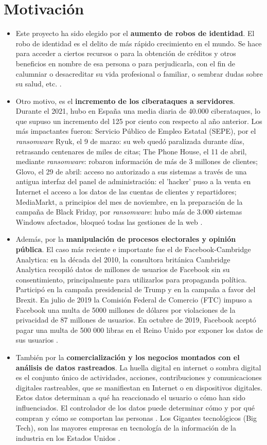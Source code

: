 \section{Motivación}
\begin{itemize}
    \item Este proyecto ha sido elegido por el \textbf{aumento de robos de identidad}. El robo de identidad es el delito de más rápido crecimiento en el mundo. Se hace para acceder a ciertos recursos o para la obtención de créditos y otros beneficios en nombre de esa persona o para perjudicarla, con el fin de calumniar o desacreditar su vida profesional o familiar, o sembrar dudas sobre su salud, etc. \cite{web:robo_de_identidad}.
    \item Otro motivo, es el \textbf{incremento de los ciberataques a servidores}. Durante el 2021, hubo en España una media diaria de 40.000 ciberataques, lo que supuso un incremento del 125 por ciento con respecto al año anterior. Los más impactantes fueron: Servicio Público de Empleo Estatal (SEPE), por el \textit{ransomware} Ryuk, el 9 de marzo: su web quedó paralizada durante días, retrasando centenares de miles de citas; The Phone House, el 11 de abril, mediante \textit{ransomware}: robaron información de más de 3 millones de clientes; Glovo, el 29 de abril: acceso no autorizado a sus sistemas a través de una antigua interfaz del panel de administración: el 'hacker' puso a la venta en Internet el acceso a los datos de las cuentas de clientes y repartidores; MediaMarkt, a principios del mes de noviembre, en la preparación de la campaña de Black Friday, por \textit{ransomware}: hubo más de 3.000 sistemas Windows afectados, bloqueó todas las gestiones de la web \cite{web:ciberataques }.
    \item Además, por la \textbf{manipulación de procesos electorales y opinión pública}. El caso más reciente e importante fue el de Facebook-Cambridge Analytica: en la década del 2010, la consultora británica Cambridge Analytica recopiló datos de millones de usuarios de Facebook sin su consentimiento, principalmente para utilizarlos para propaganda política. Participó en la campaña presidencial de Trump y en la campaña a favor del Brexit. En julio de 2019 la Comisión Federal de Comercio (FTC) impuso a Facebook una multa de 5000 millones de dólares por violaciones de la privacidad de 87 millones de usuarios. En octubre de 2019, Facebook aceptó pagar una multa de 500 000 libras en el Reino Unido por exponer los datos de sus usuarios \cite{web:CA}.
    \item También por la \textbf{comercialización y los negocios montados con el análisis de datos rastreados}. La huella digital en internet o sombra digital es el conjunto único de actividades, acciones, contribuciones y comunicaciones digitales rastreables, que se manifiestan en Internet o en dispositivos digitales. Estos datos determinan a qué ha reaccionado el usuario o cómo han sido influenciados. El controlador de los datos puede determinar cómo y por qué compran y cómo se comportan las personas \cite{web:huella}. Los Gigantes tecnológicos (Big Tech), son las mayores empresas en tecnología de la información de la industria en los Estados Unidos \cite{web:gigantes}.

\end{itemize}
